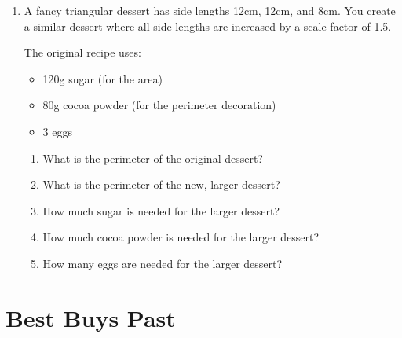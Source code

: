 \documentclass[12pt]{article}
\begin{document}
\begin{enumerate}[resume]
\item A fancy triangular dessert has side lengths 12cm, 12cm, and 8cm. You create a similar dessert where all side lengths are increased by a scale factor of 1.5.
\begin{center}
\end{center}

    The original recipe uses:
    \begin{itemize}
    \item 120g sugar (for the area)
    \item 80g cocoa powder (for the perimeter decoration)
    \item 3 eggs
    \end{itemize}
    \begin{enumerate}
    \item What is the perimeter of the original dessert?
    \item What is the perimeter of the new, larger dessert?
    \item How much sugar is needed for the larger dessert?
    \item How much cocoa powder is needed for the larger dessert?
    \item How many eggs are needed for the larger dessert?
    \end{enumerate}
\end{enumerate}

\newpage{}

\section*{Best Buys Past}
\end{document}
